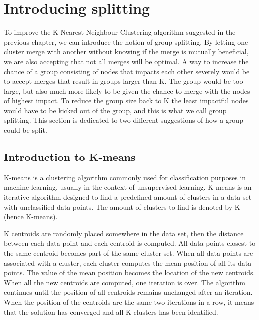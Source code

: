 %


\section{Introducing splitting}
To improve the K-Nearest Neighbour Clustering algorithm suggested in the previous chapter, we can introduce the notion of group splitting. By letting one cluster merge with another without knowing
if the merge is mutually beneficial, we are also accepting that not all merges will be optimal. A way to increase the chance of a group consisting of nodes that impacts each other severely
would be to accept merges that result in groups larger than K. The group would be too large, but also much more likely to be given the chance to merge with the nodes of highest impact. 
To reduce the group size back to K the least impactful nodes would have to be kicked out of the group, and this is what we call group splitting. 
This section is dedicated to two different suggestions of how a group could be split. 

\subsection{Introduction to K-means}
K-means is a clustering algorithm commonly used for classification purposes in machine learning, usually in the context of unsupervised learning. K-means
is an iterative algorithm designed to find a predefined amount of clusters in a data-set with unclassified data points. The amount of clusters to find is denoted by
K (hence K-means). 

K centroids are randomly placed somewhere in the data set, then the distance between each data point and each centroid is computed. All data points
closest to the same centroid becomes part of the same cluster set. When all data points are associated with a cluster, each cluster computes the mean position of all its data points.
The value of the mean position becomes the location of the new centroids. When all the new centroids are computed, one iteration is over. The algorithm continues until the position 
of all centroids remains unchanged after an iteration. When the position of the centroids are the same two iterations in a row, it means that the solution has converged and all K-clusters has been identified. 

